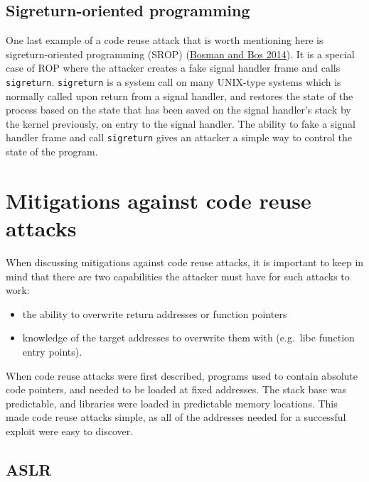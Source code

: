 \documentclass[
  a4paper,
]{report}
\providecommand{\tightlist}{%
  \setlength{\itemsep}{0pt}\setlength{\parskip}{0pt}}
\begin{document}
\hypertarget{sigreturn-oriented-programming}{%
\subsection{Sigreturn-oriented
programming}\label{sigreturn-oriented-programming}}

One last example of a code reuse attack that is worth mentioning here is
sigreturn-oriented programming
(SROP) (\protect\hyperlink{ref-Bosman2014}{Bosman and Bos 2014}). It is
a special case of ROP where the attacker creates a fake signal handler
frame and calls \texttt{sigreturn}. \texttt{sigreturn} is a system call
on many UNIX-type systems which is normally called upon return from a
signal handler, and restores the state of the process based on the state
that has been saved on the signal handler's stack by the kernel
previously, on entry to the signal handler. The ability to fake a signal
handler frame and call \texttt{sigreturn} gives an attacker a simple way
to control the state of the program.

\hypertarget{mitigations-against-code-reuse-attacks}{%
\section{Mitigations against code reuse
attacks}\label{mitigations-against-code-reuse-attacks}}

When discussing mitigations against code reuse attacks, it is important
to keep in mind that there are two capabilities the attacker must have
for such attacks to work:

\begin{itemize}
\tightlist
\item
  the ability to overwrite return addresses or function pointers
\item
  knowledge of the target addresses to overwrite them with (e.g.~libc
  function entry points).
\end{itemize}

When code reuse attacks were first described, programs used to contain
absolute code pointers, and needed to be loaded at fixed addresses. The
stack base was predictable, and libraries were loaded in predictable
memory locations. This made code reuse attacks simple, as all of the
addresses needed for a successful exploit were easy to discover.

\hypertarget{aslr}{%
\subsection{ASLR}\label{aslr}}
\end{document}
